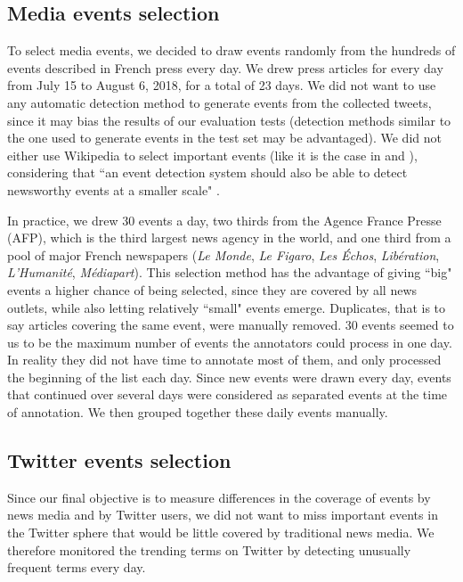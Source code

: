 	\subsection{Media events selection}
	To select media events, we decided to draw events randomly
from the hundreds of events described in French press every day. We drew press articles for every day from July 15 to August 6, 2018, for a total of 23 days. We did not want to use any automatic detection method to generate events from the collected tweets, since it may bias the results of our evaluation tests (detection methods similar to the one used to generate events in the test set may be advantaged). We did not either use Wikipedia to select important events (like it is the case in \citet{mcminn_building_2013} and \citet{petrovic_using_2012}), considering that ``an event detection system should also be able to detect newsworthy events at a smaller scale" \citep{hasan_survey_2018}. 


In practice, we drew 30 events a day, two thirds from the Agence France Presse (AFP), which is the third largest news agency in the world, and one third from a pool of major French  newspapers (\textit{Le Monde}, \textit{Le Figaro}, \textit{Les Échos}, \textit{Libération}, \textit{L'Humanité}, \textit{Médiapart}). This selection method has the advantage of giving ``big" events a higher chance of being selected, since they are covered by all news outlets, while also letting relatively ``small" events emerge. Duplicates, that is to say articles covering the same event, were manually removed. 30 events seemed to us to be the maximum number of events the annotators could process in one day. In reality they did not have time to annotate most of them, and only processed the beginning of the list each day.
Since new events were drawn every day, events that continued over several days were considered as separated events at the time of annotation. We then grouped together these daily events manually.

\subsection{Twitter events selection}
\label{Twitter events selection}
Since our final objective is to measure differences in the coverage of events by news media and by Twitter users, we did not want to miss important events in the Twitter sphere that would be little covered by traditional news media. We therefore monitored the trending terms on Twitter by detecting unusually frequent terms every day. 


